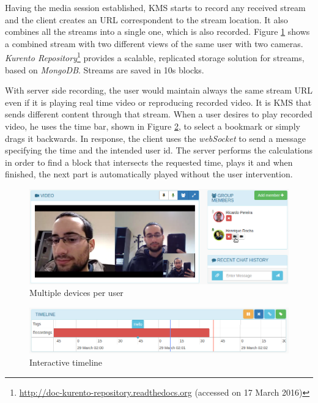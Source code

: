 \documentclass[10pt,conference]{IEEEtran}
\begin{document}
Having the media session established, \gls{KMS} starts to record any received stream and the client creates an \gls{URL} correspondent to the stream location.
It also combines all the streams into a single one, which is also recorded.
Figure \ref{fig:devices} shows a combined stream with two different views of the same user with two cameras.
\emph{Kurento Repository}\footnote{\url{http://doc-kurento-repository.readthedocs.org} (accessed on 17 March 2016)} provides a scalable, replicated storage solution for streams, based on \emph{MongoDB}.
Streams are saved in 10s blocks.

With server side recording, the user would maintain always the same stream \gls{URL} even if it is playing real time video or reproducing recorded video. 
It is \gls{KMS} that sends different content through that stream.
When a user desires to play recorded video, he uses the time bar, shown in Figure \ref{fig:timeline}, to select a bookmark or simply drags it backwards.
In response, the client uses the \emph{webSocket} to send a message specifying the time and the intended user id.
The server performs the calculations in order to find a block that intersects the requested time, plays it and when finished, the next part is automatically played without the user intervention.

	\begin{figure}
		\centering
		\includegraphics[width=\linewidth]{figures/devices2.png}
		\caption{Multiple devices per user}
		\label{fig:devices}
	\end{figure}

	\begin{figure}
		\centering
		\includegraphics[width=\linewidth]{figures/timeline.png}
		\caption{Interactive timeline}
		\label{fig:timeline}
	\end{figure}
\end{document}
